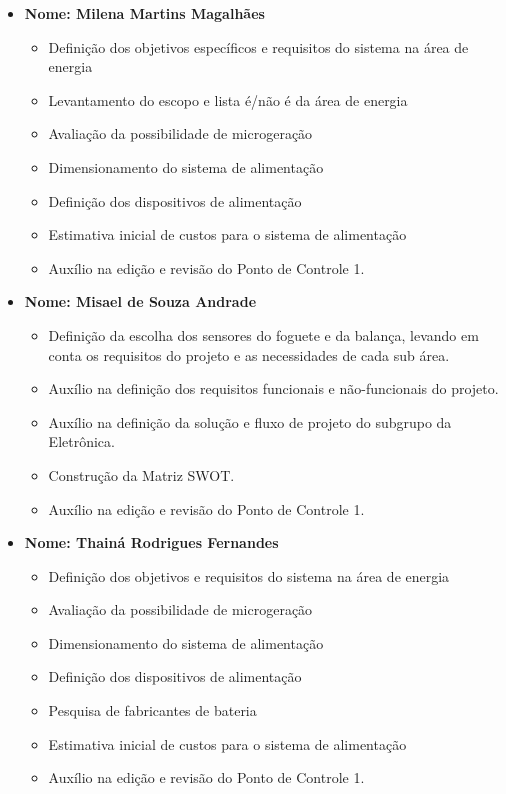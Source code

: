 \begin{itemize}
\begin{itemize}
   \end{itemize}
    
    \item \textbf{Nome: Milena Martins Magalhães}
    \begin{itemize}
   		 \item Definição dos objetivos específicos e requisitos do sistema na área de energia
   		 \item Levantamento do escopo e lista é/não é da área de energia
		\item Avaliação da possibilidade de microgeração
   		 \item Dimensionamento do sistema de alimentação
		\item Definição dos dispositivos de alimentação
		\item Estimativa inicial de custos para o sistema de alimentação
   		\item Auxílio na edição e revisão do Ponto de Controle 1.
    \end{itemize}
    
    
    \item \textbf{Nome: Misael de Souza Andrade}
    \begin{itemize}
        \item Definição da escolha dos sensores do foguete e da balança, levando em conta os requisitos do projeto e as necessidades de cada sub área.
        \item Auxílio na definição dos requisitos funcionais e não-funcionais do projeto.
        \item Auxílio na definição da solução e fluxo de projeto do subgrupo da Eletrônica.
        \item Construção da Matriz SWOT.
        \item Auxílio na edição e revisão do Ponto de Controle 1.
    \end{itemize}
    
    
    \item \textbf{Nome: Thainá Rodrigues Fernandes}
    \begin{itemize}
   		 \item Definição dos objetivos e requisitos do sistema na área de energia
		\item Avaliação da possibilidade de microgeração
   		\item Dimensionamento do sistema de alimentação
		\item Definição dos dispositivos de alimentação
		\item Pesquisa de fabricantes de bateria
		\item Estimativa inicial de custos para o sistema de alimentação
   		\item Auxílio na edição e revisão do Ponto de Controle 1.
    \end{itemize}
    
    
    
\end{itemize}

